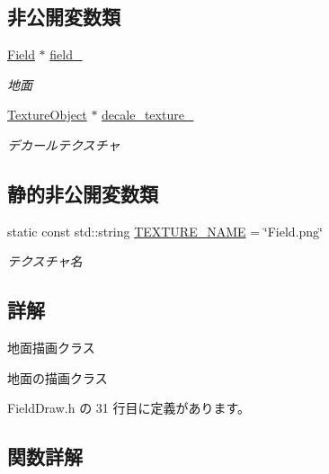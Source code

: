 \subsection*{非公開変数類}
\begin{DoxyCompactItemize}
\item 
\mbox{\hyperlink{class_field}{Field}} $\ast$ \mbox{\hyperlink{class_field_draw_a5d81171db83ea98a33c0e6f68b5dd351}{field\+\_\+}}
\begin{DoxyCompactList}\small\item\em 地面 \end{DoxyCompactList}\item 
\mbox{\hyperlink{class_texture_object}{Texture\+Object}} $\ast$ \mbox{\hyperlink{class_field_draw_a1d9e36a7e8d6dd8791d2dd82bceac28f}{decale\+\_\+texture\+\_\+}}
\begin{DoxyCompactList}\small\item\em デカールテクスチャ \end{DoxyCompactList}\end{DoxyCompactItemize}
\subsection*{静的非公開変数類}
\begin{DoxyCompactItemize}
\item 
static const std\+::string \mbox{\hyperlink{class_field_draw_a0100eac615b34df95aaf3627182fb9f1}{T\+E\+X\+T\+U\+R\+E\+\_\+\+N\+A\+ME}} = \char`\"{}Field.\+png\char`\"{}
\begin{DoxyCompactList}\small\item\em テクスチャ名 \end{DoxyCompactList}\end{DoxyCompactItemize}


\subsection{詳解}
地面描画クラス 

地面の描画クラス 

 Field\+Draw.\+h の 31 行目に定義があります。



\subsection{関数詳解}
\mbox{\label{class_field_draw_a1915497654d079074dbd3e058db06a78}} 
